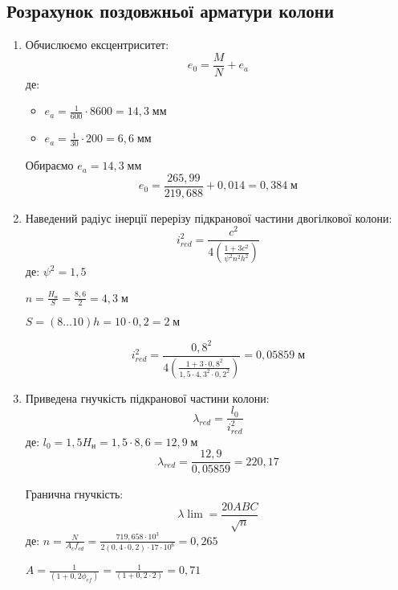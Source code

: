 \documentclass[a4paper,14pt]{article}
\begin{document}
\subsection{Розрахунок поздовжньої арматури колони}

\begin{enumerate}
    \item Обчислюємо ексцентриситет:
        \begin{equation}\label{eq:e_0}
            e_0 = \frac{M}{N}+e_a
        \end{equation}
        де: \begin{itemize}
                \item $e_a = \frac{1}{600} \cdot 8600 = 14,3\;\textit{мм}$
                \item $e_a = \frac{1}{30} \cdot 200 = 6,6\;\textit{мм}$
            \end{itemize}
        Обираємо $e_a = 14,3\;\textit{мм}$
        $$e_0 = \frac{265,99}{219,688}+0,014 = 0,384\;\textit{м}$$
    \item Наведений радіус інерції перерізу підкранової частини двогілкової колони:
        \begin{equation}
            i_{red}^2 = \frac{c^2}{4(\frac{1+3c^2}{\psi^2n^2h^2})}
        \end{equation}
        де: $\psi^2 = 1,5$

                $n = \frac{H_\textit{н}}{S} = \frac{8,6}{2} = 4,3\;\textit{м}$

                $S = (8 \ldots 10)h = 10 \cdot 0,2 = 2\;\textit{м}$
           
        $$i_{red}^2 = \frac{0,8^2}{4(\frac{1+3 \cdot 0,8^2}{1,5 \cdot 4,3^2 \cdot 0,2^2})} = 0,05859\;\textit{м}$$
    \item Приведена гнучкість підкранової частини колони:
        \begin{equation}
            \lambda_{red} = \frac{l_0}{i_{red}^2}
        \end{equation}
        де: $l_0 = 1,5H_\textit{н} = 1,5 \cdot 8,6 = 12,9\;\textit{м}$
        $$\lambda_{red} = \frac{12,9}{0,05859} = 220,17$$
        
        Гранична гнучкість:
        \begin{equation}
            \lambda \lim = \frac{20ABC}{\sqrt{n}}
        \end{equation}
        де: $n = \frac{N}{A_cf_{cd}} = \frac{719,658 \cdot 10^3}{2(0,4 \cdot 0,2) \cdot 17 \cdot 10^6} = 0,265$

            $A = \frac{1}{(1+0,2\phi_{ef})} = \frac{1}{(1+0,2 \cdot 2)} = 0,71$


\end{enumerate}
\end{document}
